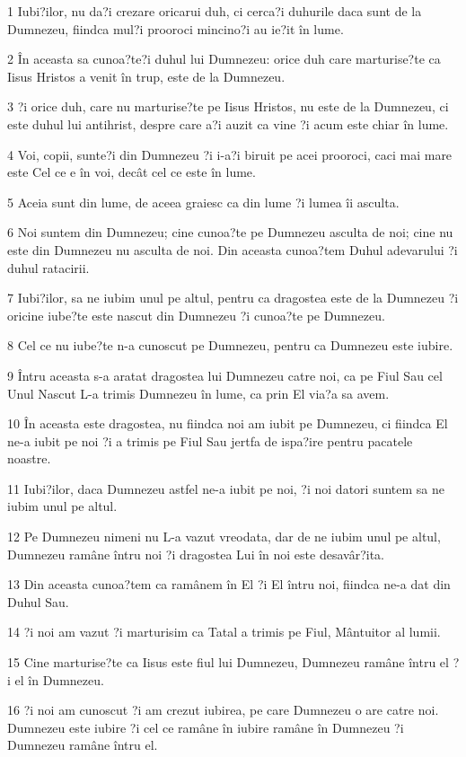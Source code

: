 \par 1 Iubi?ilor, nu da?i crezare oricarui duh, ci cerca?i duhurile daca sunt de la Dumnezeu, fiindca mul?i prooroci mincino?i au ie?it în lume.
\par 2 În aceasta sa cunoa?te?i duhul lui Dumnezeu: orice duh care marturise?te ca Iisus Hristos a venit în trup, este de la Dumnezeu.
\par 3 ?i orice duh, care nu marturise?te pe Iisus Hristos, nu este de la Dumnezeu, ci este duhul lui antihrist, despre care a?i auzit ca vine ?i acum este chiar în lume.
\par 4 Voi, copii, sunte?i din Dumnezeu ?i i-a?i biruit pe acei prooroci, caci mai mare este Cel ce e în voi, decât cel ce este în lume.
\par 5 Aceia sunt din lume, de aceea graiesc ca din lume ?i lumea îi asculta.
\par 6 Noi suntem din Dumnezeu; cine cunoa?te pe Dumnezeu asculta de noi; cine nu este din Dumnezeu nu asculta de noi. Din aceasta cunoa?tem Duhul adevarului ?i duhul ratacirii.
\par 7 Iubi?ilor, sa ne iubim unul pe altul, pentru ca dragostea este de la Dumnezeu ?i oricine iube?te este nascut din Dumnezeu ?i cunoa?te pe Dumnezeu.
\par 8 Cel ce nu iube?te n-a cunoscut pe Dumnezeu, pentru ca Dumnezeu este iubire.
\par 9 Întru aceasta s-a aratat dragostea lui Dumnezeu catre noi, ca pe Fiul Sau cel Unul Nascut L-a trimis Dumnezeu în lume, ca prin El via?a sa avem.
\par 10 În aceasta este dragostea, nu fiindca noi am iubit pe Dumnezeu, ci fiindca El ne-a iubit pe noi ?i a trimis pe Fiul Sau jertfa de ispa?ire pentru pacatele noastre.
\par 11 Iubi?ilor, daca Dumnezeu astfel ne-a iubit pe noi, ?i noi datori suntem sa ne iubim unul pe altul.
\par 12 Pe Dumnezeu nimeni nu L-a vazut vreodata, dar de ne iubim unul pe altul, Dumnezeu ramâne întru noi ?i dragostea Lui în noi este desavâr?ita.
\par 13 Din aceasta cunoa?tem ca ramânem în El ?i El întru noi, fiindca ne-a dat din Duhul Sau.
\par 14 ?i noi am vazut ?i marturisim ca Tatal a trimis pe Fiul, Mântuitor al lumii.
\par 15 Cine marturise?te ca Iisus este fiul lui Dumnezeu, Dumnezeu ramâne întru el ?i el în Dumnezeu.
\par 16 ?i noi am cunoscut ?i am crezut iubirea, pe care Dumnezeu o are catre noi. Dumnezeu este iubire ?i cel ce ramâne în iubire ramâne în Dumnezeu ?i Dumnezeu ramâne întru el.

